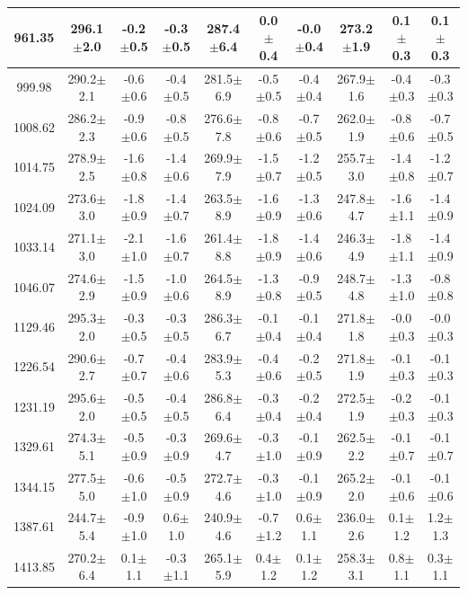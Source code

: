 \documentclass[agupp]{aguplus}              %
\begin{document}
\begin{article}
\begin{center}
\begin{table}[ht]
{\begin{tabular}{c|ccc|ccc|ccc}
961.35 & 296.1$\pm$2.0 & -0.2$\pm$0.5 & -0.3$\pm$0.5 & 287.4$\pm$6.4 &  0.0$\pm$0.4 & -0.0$\pm$0.4 & 273.2$\pm$1.9 &  0.1$\pm$0.3 &  0.1$\pm$0.3 \\ 
\hline
999.98 & 290.2$\pm$2.1 & -0.6$\pm$0.6 & -0.4$\pm$0.5 & 281.5$\pm$6.9 & -0.5$\pm$0.5 & -0.4$\pm$0.4 & 267.9$\pm$1.6 & -0.4$\pm$0.3 & -0.3$\pm$0.3 \\ 
1008.62 & 286.2$\pm$2.3 & -0.9$\pm$0.6 & -0.8$\pm$0.5 & 276.6$\pm$7.8 & -0.8$\pm$0.6 & -0.7$\pm$0.5 & 262.0$\pm$1.9 & -0.8$\pm$0.6 & -0.7$\pm$0.5 \\ 
1014.75 & 278.9$\pm$2.5 & -1.6$\pm$0.8 & -1.4$\pm$0.6 & 269.9$\pm$7.9 & -1.5$\pm$0.7 & -1.2$\pm$0.5 & 255.7$\pm$3.0 & -1.4$\pm$0.8 & -1.2$\pm$0.7 \\ 
1024.09 & 273.6$\pm$3.0 & -1.8$\pm$0.9 & -1.4$\pm$0.7 & 263.5$\pm$8.9 & -1.6$\pm$0.9 & -1.3$\pm$0.6 & 247.8$\pm$4.7 & -1.6$\pm$1.1 & -1.4$\pm$0.9 \\ 
1033.14 & 271.1$\pm$3.0 & -2.1$\pm$1.0 & -1.6$\pm$0.7 & 261.4$\pm$8.8 & -1.8$\pm$0.9 & -1.4$\pm$0.6 & 246.3$\pm$4.9 & -1.8$\pm$1.1 & -1.4$\pm$0.9 \\ 
1046.07 & 274.6$\pm$2.9 & -1.5$\pm$0.9 & -1.0$\pm$0.6 & 264.5$\pm$8.9 & -1.3$\pm$0.8 & -0.9$\pm$0.5 & 248.7$\pm$4.8 & -1.3$\pm$1.0 & -0.8$\pm$0.8 \\ 
\hline
1129.46 & 295.3$\pm$2.0 & -0.3$\pm$0.5 & -0.3$\pm$0.5 & 286.3$\pm$6.7 & -0.1$\pm$0.4 & -0.1$\pm$0.4 & 271.8$\pm$1.8 & -0.0$\pm$0.3 & -0.0$\pm$0.3 \\ 
1226.54 & 290.6$\pm$2.7 & -0.7$\pm$0.7 & -0.4$\pm$0.6 & 283.9$\pm$5.3 & -0.4$\pm$0.6 & -0.2$\pm$0.5 & 271.8$\pm$1.9 & -0.1$\pm$0.3 & -0.1$\pm$0.3 \\ 
1231.19 & 295.6$\pm$2.0 & -0.5$\pm$0.5 & -0.4$\pm$0.5 & 286.8$\pm$6.4 & -0.3$\pm$0.4 & -0.2$\pm$0.4 & 272.5$\pm$1.9 & -0.2$\pm$0.3 & -0.1$\pm$0.3 \\ 
\hline
1329.61 & 274.3$\pm$5.1 & -0.5$\pm$0.9 & -0.3$\pm$0.9 & 269.6$\pm$4.7 & -0.3$\pm$1.0 & -0.1$\pm$0.9 & 262.5$\pm$2.2 & -0.1$\pm$0.7 & -0.1$\pm$0.7 \\ 
1344.15 & 277.5$\pm$5.0 & -0.6$\pm$1.0 & -0.5$\pm$0.9 & 272.7$\pm$4.6 & -0.3$\pm$1.0 & -0.1$\pm$0.9 & 265.2$\pm$2.0 & -0.1$\pm$0.6 & -0.1$\pm$0.6 \\ 
1387.61 & 244.7$\pm$5.4 & -0.9$\pm$1.0 &  0.6$\pm$1.0 & 240.9$\pm$4.6 & -0.7$\pm$1.2 &  0.6$\pm$1.1 & 236.0$\pm$2.6 &  0.1$\pm$1.2 &  1.2$\pm$1.3 \\ 
1413.85 & 270.2$\pm$6.4 &  0.1$\pm$1.1 & -0.3$\pm$1.1 & 265.1$\pm$5.9 &  0.4$\pm$1.2 &  0.1$\pm$1.2 & 258.3$\pm$3.1 &  0.8$\pm$1.1 &  0.3$\pm$1.1 \\ 

\end{tabular}}
\end{table}
\end{center}
\end{article}
\end{document}
